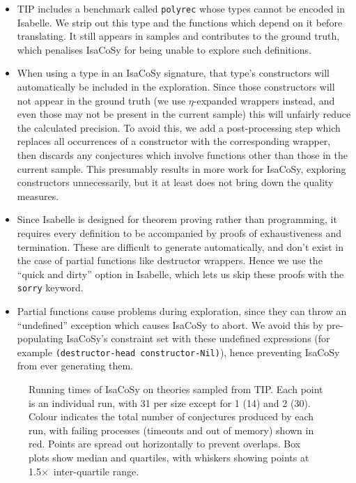 \begin{itemize}
\item TIP includes a benchmark called \texttt{polyrec} whose types cannot be
  encoded in Isabelle. We strip out this type and the functions which depend on
  it before translating. It still appears in samples and contributes to the
  ground truth, which penalises IsaCoSy for being unable to explore such
  definitions.
\item When using a type in an IsaCoSy signature, that type's constructors will
  automatically be included in the exploration. Since those constructors will
  not appear in the ground truth (we use $\eta$-expanded wrappers instead, and
  even those may not be present in the current sample) this will unfairly reduce
  the calculated precision. To avoid this, we add a post-processing step which
  replaces all occurrences of a constructor with the corresponding wrapper, then
  discards any conjectures which involve functions other than those in the
  current sample. This presumably results in more work for IsaCoSy, exploring
  constructors unnecessarily, but it at least does not bring down the quality
  measures.
\item Since Isabelle is designed for theorem proving rather than programming, it
  requires every definition to be accompanied by proofs of exhaustiveness and
  termination. These are difficult to generate automatically, and don't exist in
  the case of partial functions like destructor wrappers. Hence we use the
  ``quick and dirty'' option in Isabelle, which lets us skip these proofs with
  the \texttt{sorry} keyword.
\item Partial functions cause problems during exploration, since they can throw
  an ``undefined'' exception which causes IsaCoSy to abort. We avoid this by
  pre-populating IsaCoSy's constraint set with these undefined expressions
  (for example \texttt{(destructor-head constructor-Nil)}), hence preventing
  IsaCoSy from ever generating them.
\end{itemize}

\begin{figure}
  \centering
  
  \caption{Running times of IsaCoSy on theories sampled from TIP. Each point
    is an individual run, with 31 per size except for 1 (14) and 2 (30). Colour
    indicates the total number of conjectures produced by each run, with failing
    processes (timeouts and out of memory) shown in red. Points are spread out
    horizontally to prevent overlaps. Box plots show median and quartiles, with
    whiskers showing points at 1.5$\times$~inter-quartile range.}
  \label{figure:isacosy_runtimes}
\end{figure}

